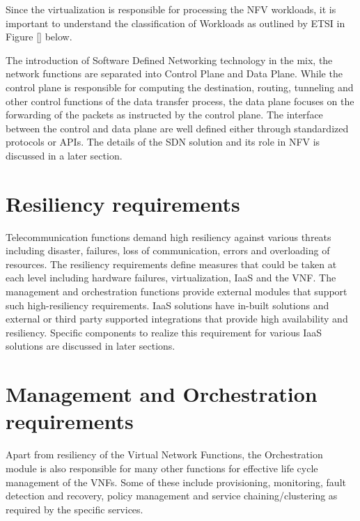 \documentclass[../seminar.tex]{subfiles}
\begin{document}
Since the virtualization is responsible for processing the NFV workloads, it is important to understand the classification of Workloads as outlined by ETSI in Figure [] below.

The introduction of Software Defined Networking technology in the mix, the network functions are separated into Control Plane and Data Plane. While the control plane is responsible for computing the destination, routing, tunneling and other control functions of the data transfer process, the data plane focuses on the forwarding of the packets as instructed by the control plane. The interface between the control and data plane are well defined either through standardized protocols or APIs. The details of the SDN solution and its role in NFV is discussed in a later section. 

	
\section{Resiliency requirements}

Telecommunication functions demand high resiliency against various threats including disaster, failures, loss of communication, errors and overloading of resources. The resiliency requirements define measures that could be taken at each level including hardware failures, virtualization, IaaS and the VNF. The management and orchestration functions provide external modules that support such high-resiliency requirements. IaaS solutions have in-built solutions and external or third party supported integrations that provide high availability and resiliency. Specific components to realize this requirement for various IaaS solutions are discussed in later sections.

	
\section{Management and Orchestration requirements}

Apart from resiliency of the Virtual Network Functions, the Orchestration module is also responsible for many other functions for effective life cycle management of the VNFs. Some of these include provisioning, monitoring, fault detection and recovery, policy management and service chaining/clustering as required by the specific services.
	
	
\end{document}
